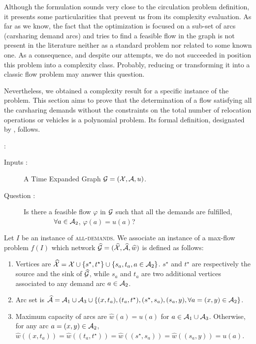 Although the {\SDP} formulation sounds very close to the circulation problem definition, it presents some particularities that prevent us from its complexity evaluation.
As far as we know, the fact that the optimization is focused on a sub-set of arcs (carsharing demand arcs) and tries to find a feasible flow in the graph is not present in the literature neither as a standard problem nor related to some known one.
As a consequence, and despite our attempts, we do not succeeded in position this problem into a complexity class.
Probably, reducing or transforming it into a classic flow problem may answer this question.

\medskip
Nevertheless, we obtained a complexity result for a specific instance of the problem. 
This section aims to prove that the determination of a flow satisfying all the carsharing demands without the constraints on the total number of relocation operations or vehicles is a polynomial problem.
Its formal definition, designated by {\SDPALLDEMANDS}, follows.

\bigskip
\noindent{\SDPALLDEMANDS}:
\begin{description}
\item[Inputs :] A Time Expanded Graph $\mathcal{G} = (\mathcal{X}, \mathcal{A}, u)$.
\item[Question :] Is there a feasible flow $\varphi$ in $\mathcal{G}$ such that all the demands are fulfilled,\newline
\mbox{~~~~~~~~} \ie $\forall a \in \mathcal{A}_2$, $\varphi(a) = u(a)$?
\end{description}

Let $I$ be an instance of \textsc{all-demands}.
We associate an instance of a max-flow problem $f(I)$ which network $\widehat{\mathcal{G}}=(\widehat{\mathcal{X}}, \widehat{\mathcal{A}}, \widehat{w})$ is defined as follows:
\begin{enumerate}
\item
Vertices are $\widehat{\mathcal{X}} = \mathcal{X} \cup \{s^\star, t^\star\} \cup \{s_a, t_a, a \in \mathcal{A}_2\}$.
$s^\star$ and $t^\star$ are respectively the source and the sink of $\widehat{\mathcal{G}}$, while $s_a$ and $t_a$ are two additional vertices associated to any demand arc $a \in \mathcal{A}_2$.
\item
Arc set is $\widehat{\mathcal{A}} = \mathcal{A}_1 \cup \mathcal{A}_3 \cup \{ (x,t_a), (t_a,t^\star), (s^\star, s_a), (s_a,y), \forall a=(x,y)\in \mathcal{A}_2\}$.
\item
Maximum capacity of arcs are $\widehat{w}(a) = u(a)$ for $a \in \mathcal{A}_1 \cup \mathcal{A}_3$.
Otherwise, for any arc $a=(x,y) \in \mathcal{A}_2$, $\widehat{w}((x,t_a))=\widehat{w}((t_a,t^\star))=\widehat{w}((s^\star, s_a))=\widehat{w}( (s_a,y))=u(a)$.
\end{enumerate}


